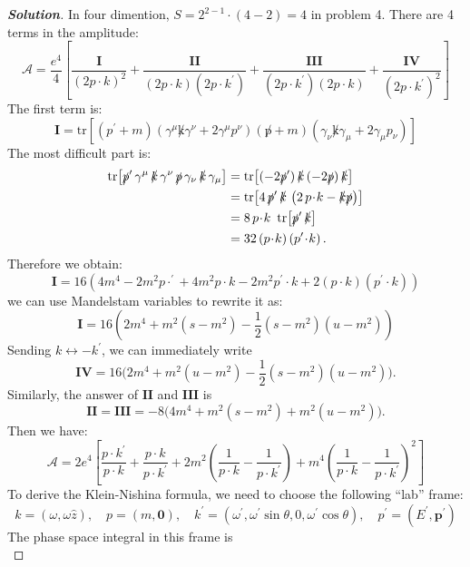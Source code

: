 \documentclass[11pt]{article}
\newenvironment{solution}[1][]{\begin{proof}[\textbf{Solution}]}{\end{proof}}
\begin{document}
\begin{solution}[14.9]
	In four dimention, $S=2^{2-1}\cdot(4-2)=4$ in problem 4. There are 4 terms in the amplitude:
	$$
	\mathcal{A}=\frac{e^4}{4}\left[\frac{\mathbf{I}}{(2p\cdot k)^2}+\frac{\mathbf{II}}{(2p\cdot k)(2p\cdot k^{\prime})}+\frac{\mathbf{III}}{(2p\cdot k^{\prime})(2p\cdot k)}+\frac{\mathbf{IV}}{(2p\cdot k^{\prime})^2}\right]
	$$
	The first term is:
	\[
	\mathbf{I}=\mathrm{tr}\left[(p^{\prime}+m)(\gamma^{\mu}\not k\gamma^{\nu}+2\gamma^{\mu}p^{\nu})(\not p+m)(\gamma_{\nu}\not k\gamma_{\mu}+2\gamma_{\mu}p_{\nu})\right]
	\]
	The most difficult part is:
\[
\begin{aligned}
	\operatorname{tr}\!\left[\slashed{p}'\,\gamma^\mu\,\slashed{k}\,\gamma^\nu\,\slashed{p}\,\gamma_\nu\,\slashed{k}\,\gamma_\mu\right]
	&= \operatorname{tr}\!\left[(-2\slashed{p}')\,\slashed{k}\,(-2\slashed{p})\,\slashed{k}\right] \\
	&= \operatorname{tr}\!\left[4\,\slashed{p}'\,\slashed{k}\,\left(2\,p\!\cdot\! k-\slashed{k}\slashed{p}\right)\right] \\
	&= 8\,p\!\cdot\! k\ \operatorname{tr}\!\left[\slashed{p}'\,\slashed{k}\right] \\
	&= 32\,(p\!\cdot\! k)\,(p'\!\cdot\! k)\,.
\end{aligned}
\]
	Therefore we obtain:
	\[
	\mathbf{I}=16\left(4m^4-2m^2p\cdotp^{\prime}+4m^2p\cdot k-2m^2p^{\prime}\cdot k+2(p\cdot k)(p^{\prime}\cdot k)\right)
	\]
	we can use Mandelstam variables to rewrite it as:
	\[
	\mathbf{I}=16{\left(2m^4+m^2(s-m^2)-\frac{1}{2}(s-m^2)(u-m^2)\right)}
	\]
	Sending $k\leftrightarrow-k^\prime$, we can immediately write
	$$
	\mathbf{IV}=16\big(2m^4+m^2(u-m^2)-\frac12(s-m^2)(u-m^2)\big).
	$$
	Similarly, the answer of $\mathbf{II}$ and $\mathbf{III}$ is
	$$\mathbf{II}=\mathbf{III}=-8\big(4m^4+m^2(s-m^2)+m^2(u-m^2)\big).$$
	Then we have:
	\[
	\mathcal{A}=2e^4\left[\frac{p\cdot k^{\prime}}{p\cdot k}+\frac{p\cdot k}{p\cdot k^{\prime}}+2m^2\left(\frac{1}{p\cdot k}-\frac{1}{p\cdot k^{\prime}}\right)+m^4\left(\frac{1}{p\cdot k}-\frac{1}{p\cdot k^{\prime}}\right)^2\right]
	\]
	To derive the Klein-Nishina formula, we need to choose the following “lab” frame:
	\[
			k=(\omega,\omega\hat{z}),\quad p=(m,\mathbf{0}),\quad
			k^{\prime}=(\omega^{\prime},\omega^{\prime}\sin\theta,0,\omega^{\prime}\cos\theta),\quad p^{\prime}=(E^{\prime},\mathbf{p}^{\prime})
	\]
	The phase space integral in this frame is
	\[
\]
\end{solution}
\end{document}
